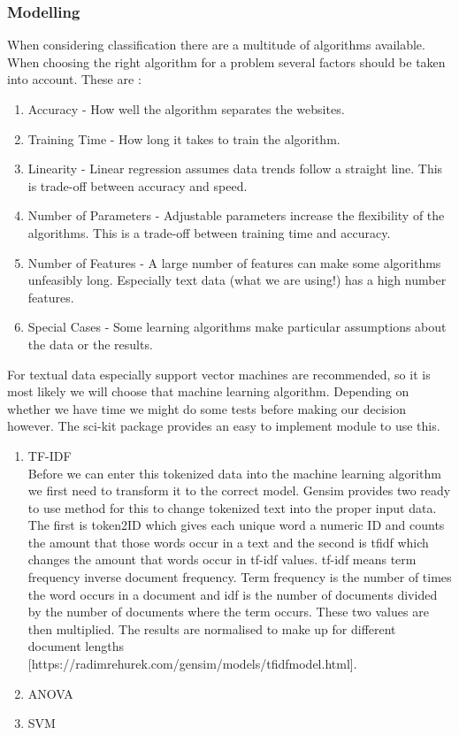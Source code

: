 \subsubsection{Modelling}
When considering classification there are a multitude of algorithms available. When choosing the right algorithm for a problem several factors should be taken into account. These are \cite{MLCheatSheet}:
    \begin{enumerate}
        \item Accuracy - How well the algorithm separates the websites.
        \item Training Time - How long it takes to train the algorithm.
        \item Linearity - Linear regression assumes data trends follow a straight line. This is trade-off between accuracy and speed.
        \item Number of Parameters - Adjustable parameters increase the flexibility of the algorithms. This is a trade-off between training time and accuracy.
        \item Number of Features - A large number of features can make some algorithms unfeasibly long. Especially text data (what we are using!) has a high number features.
        \item Special Cases - Some learning algorithms make particular assumptions about the data or the results.
    \end{enumerate}
    
For textual data especially support vector machines are recommended\cite{MLCheatSheet, ml_text}, so it is most likely we will choose that machine learning algorithm. Depending on whether we have time we might do some tests before making our decision however. The sci-kit package\cite{scikit-learn} provides an easy to implement module to use this.

\begin{enumerate}
\item TF-IDF \\ 
Before we can enter this tokenized data into the machine learning algorithm we first need to transform it to the correct model. Gensim provides two ready to use method for this to change tokenized text into the proper input data. The first is token2ID which gives each unique word a numeric ID and counts the amount that those words occur in a text and the second is tfidf which changes the amount that words occur in tf-idf values. tf-idf means term frequency inverse document frequency. Term frequency is the number of times the word occurs in a document and idf is the number of documents divided by the number of documents where the term occurs. These two values are then multiplied. The results are normalised to make up for different document lengths [https://radimrehurek.com/gensim/models/tfidfmodel.html].
\item ANOVA

\item SVM
\end{enumerate}

